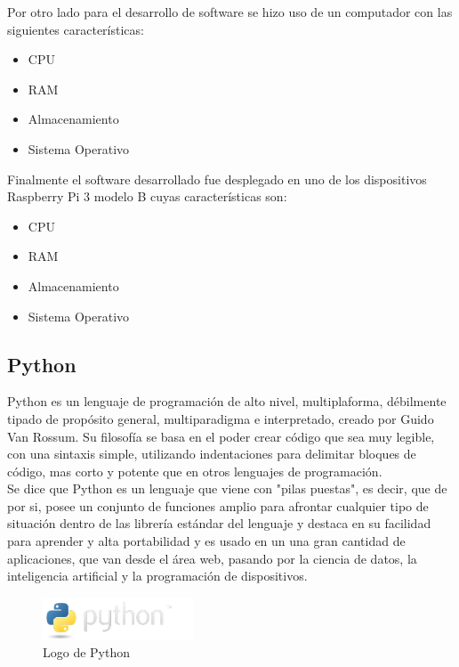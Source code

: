 Por otro lado para el desarrollo de software se hizo uso de un computador con las siguientes características:
\begin{itemize}
\item CPU
\item RAM
\item Almacenamiento
\item Sistema Operativo
\end{itemize}

Finalmente el software desarrollado fue desplegado en uno de los dispositivos Raspberry Pi 3 modelo B cuyas características son:
\begin{itemize}
\item CPU
\item RAM
\item Almacenamiento
\item Sistema Operativo
\end{itemize}

\subsection{Python}
Python es un lenguaje de programación de alto nivel, multiplaforma,  débilmente tipado de propósito general, multiparadigma e interpretado\cite{whatspython}, creado por Guido Van Rossum. Su filosofía se basa en el poder crear código que sea muy legible, con una sintaxis simple, utilizando indentaciones para delimitar bloques de código, mas corto y potente que en otros lenguajes de programación.\cite{Guido}\\

Se dice que Python es un lenguaje que viene con "pilas puestas"\cite{pep206}, es decir, que de por si, posee un conjunto de funciones amplio para afrontar cualquier tipo de situación dentro de las librería estándar del lenguaje y destaca en su facilidad para aprender y alta portabilidad y es usado en un una gran cantidad de aplicaciones, que van desde el área web, pasando por la ciencia de datos, la inteligencia artificial y la programación de dispositivos.  

\begin{figure}[ht]
\centering
\includegraphics[width=0.4\textwidth]{Figuras/python-logo.png}
\caption{\label{fig:python-logo}Logo de Python}
\vspace*{-10pt}
\end{figure}


